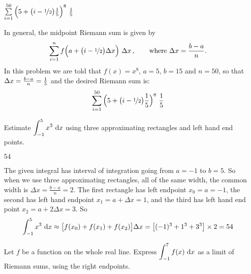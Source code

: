 \begin{answer}
$\sum\limits_{i=1}^{50} \Big(5+\big(i-\nicefrac{1}{2}\big)\frac{1}{5}\Big)^8
\ \frac{1}{5}$
\end{answer}

\begin{solution}
In general, the midpoint Riemann sum is given by
\begin{align*}
\sum_{i=1}^n f\Big(a+\big(i-\nicefrac{1}{2}\big)\Delta x\Big)\ \Delta x \, ,
\qquad \mbox{where } \Delta x = \frac{b-a}{n}.
\end{align*}
In this problem we are told that $f(x)=x^8$, $a=5$, $b=15$ and $n=50$,
so that $\Delta x = \frac{b-a}{n} = \frac{1}{5}$ and the desired Riemann sum is:
\begin{align*}
\sum_{i=1}^{50} \Big(5+\big(i-\nicefrac{1}{2}\big)\frac{1}{5}\Big)^8
\ \frac{1}{5}
\end{align*}
\end{solution}




\begin{question}[2016Q1]
Estimate $\displaystyle\int_{-1}^5 x^3\,\,\mathrm{d}x$ using three approximating rectangles
and left hand end points.
\end{question}


\begin{answer}
$54$
\end{answer}

\begin{solution}
The given integral has interval of integration going from $a=-1$ to $b=5$.
So when we use three approximating rectangles, all of the same width, the common width
is $\Delta x=\frac{b-a}{n} = 2$. The first rectangle has left  endpoint $x_0=a=-1$,
the second has left hand endpoint $x_1=a+\Delta x=1$, and the third has left hand end point
$x_2=a+2\Delta x=3$. So
\begin{align*}
\int_{-1}^5 x^3\,\,\mathrm{d}x
\approx \big[f(x_0)+f(x_1)+f(x_2)\big]\Delta x
=\big[(-1)^3+1^3+3^3\big]\times2
=54
\end{align*}
\end{solution}




\begin{Mquestion}[2016Q1]
Let $f$ be a function on the whole real line.  Express
$\displaystyle\int_{-1}^{7}f(x)\,\,\mathrm{d}x$ as a limit of Riemann sums, using the
right endpoints.
\end{Mquestion}

